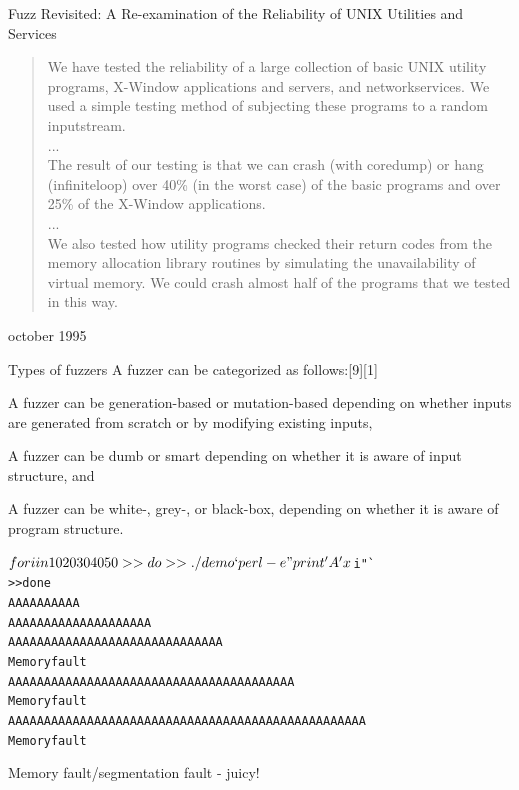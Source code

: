 \documentclass[Screen16to9,17pt]{foils}
\begin{document}

Fuzz Revisited: A Re-examination of the Reliability
of
UNIX Utilities and Services

\begin{quote}
We have tested the reliability of a large collection of basic UNIX utility programs, X-Window
applications and servers, and networkservices. We used a simple testing method of subjecting these
programs to a random inputstream.\\
...\\
The result of our testing is that we can crash (with coredump) or hang (infiniteloop) over 40\% (in the
worst case) of the basic programs and over 25\% of the X-Window applications.\\
...\\
We also tested how utility programs checked their return codes from the memory allocation library
routines by simulating the unavailability of virtual memory. We could crash almost half of the programs
that we tested in this way.
\end{quote}

\centerline{october 1995}




Types of fuzzers
A fuzzer can be categorized as follows:[9][1]
\begin{list2}
\item A fuzzer can be generation-based or mutation-based depending on whether inputs are generated from scratch or by modifying existing inputs,
\item A fuzzer can be dumb or smart depending on whether it is aware of input structure, and
\item A fuzzer can be white-, grey-, or black-box, depending on whether it is aware of program structure.
\end{list2}



\begin{alltt}
$ for i in 10 20 30 40 50
>> do
>> ./demo `perl -e "print 'A'x$i"`
>> done
AAAAAAAAAA
AAAAAAAAAAAAAAAAAAAA
AAAAAAAAAAAAAAAAAAAAAAAAAAAAAA
Memory fault
AAAAAAAAAAAAAAAAAAAAAAAAAAAAAAAAAAAAAAAA
Memory fault
AAAAAAAAAAAAAAAAAAAAAAAAAAAAAAAAAAAAAAAAAAAAAAAAAA
Memory fault
\end{alltt}

\centerline{Memory fault/segmentation fault - juicy!}
\end{document}
